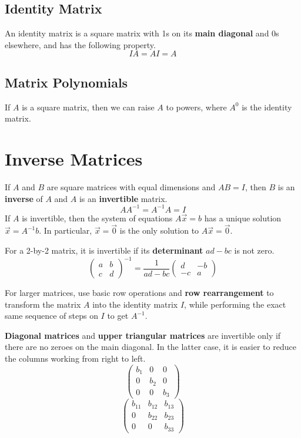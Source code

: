 \documentclass[11pt]{article}
\begin{document}
		\subsection{Identity Matrix}
			An identity matrix is a square matrix with 1s on its \textbf{main diagonal} and 0s elsewhere, and has the following property.
			\begin{equation}
				IA=AI=A
			\end{equation}
			
		\subsection{Matrix Polynomials}
			If $A$ is a square matrix, then we can raise $A$ to powers, where $A^0$ is the identity matrix.
			
\section{Inverse Matrices}
	If $A$ and $B$ are square matrices with equal dimensions and $AB = I$, then $B$ is an \textbf{inverse} of $A$ and $A$ is an \textbf{invertible} matrix.
	\begin{equation}
		AA^{-1} = A^{-1}A = I
	\end{equation}
	If $A$ is invertible, then the system of equations $A\vec{x}=b$ has a unique solution $\vec{x}=A^{-1}b$. In particular, $\vec{x}=\vec{0}$ is the only solution to $A\vec{x}=\vec{0}$.
	
	For a 2-by-2 matrix, it is invertible if its \textbf{determinant} $ad-bc$ is not zero.
	\begin{equation}
		\left(\begin{matrix}
			a&b\\c&d
		\end{matrix}\right)^{-1} = \frac{1}{ad-bc}\left(\begin{matrix}
			d&-b\\-c&a
		\end{matrix}\right)
	\end{equation}
	
	For larger matrices, use basic row operations and \textbf{row rearrangement} to transform the matrix $A$ into the identity matrix $I$, while performing the exact same sequence of steps on $I$ to get $A^{-1}$.
	
	\textbf{Diagonal matrices} and \textbf{upper triangular matrices} are invertible only if there are no zeroes on the main diagonal. In the latter case, it is easier to reduce the columns working from right to left.
	\begin{equation}
		\begin{pmatrix}
			b_1 & 0 & 0\\
			0 & b_2 & 0\\
			0 & 0 & b_3
		\end{pmatrix}
	\end{equation}
	\begin{equation}
		\begin{pmatrix}
			b_11 & b_12 & b_13\\
			0 & b_22 & b_23\\
			0 & 0 & b_33
		\end{pmatrix}
	\end{equation}
	
\end{document}
